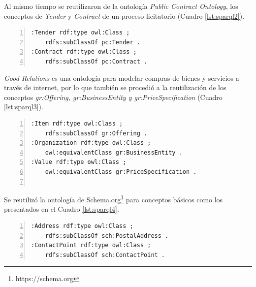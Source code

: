  Al mismo tiempo se reutilizaron de la ontología \textit{Public Contract Ontology}\cite{klimek2012lod2}, los conceptos de \textit{Tender} y \textit{Contract} de un proceso licitatorio (Cuadro \ref{lst:sparql2}).\hfill \break

\noindent\begin{minipage}{\textwidth}
 \begin{lstlisting}[captionpos=b, caption={Conceptos de \textit{Tender} y \textit{Contract}}, label={lst:sparql2},  numbers=left,  numberstyle=\tiny\color{mygray},frame=single]
:Tender rdf:type owl:Class ;
    rdfs:subClassOf pc:Tender .
:Contract rdf:type owl:Class ;
    rdfs:subClassOf pc:Contract .
\end{lstlisting}
\end{minipage}

 \textit{Good Relations}\cite{hepp2008goodrelations} es una ontología para modelar compras de bienes y servicios a través de internet, por lo que también se procedió a la reutilización de los conceptos \textit{gr:Offering, gr:BusinessEntity y gr:PriceSpecification} (Cuadro \ref{lst:sparql3}).\hfill \break

\noindent\begin{minipage}{\textwidth}
 \begin{lstlisting}[captionpos=b, caption={Conceptos de \textit{Organization} y \textit{Price} }, label={lst:sparql3},  numbers=left,  numberstyle=\tiny\color{mygray},frame=single]
:Item rdf:type owl:Class ;
    rdfs:subClassOf gr:Offering .
:Organization rdf:type owl:Class ;
    owl:equivalentClass gr:BusinessEntity .
:Value rdf:type owl:Class ;
    owl:equivalentClass gr:PriceSpecification .


 \end{lstlisting}
\end{minipage}

 Se reutilizó la ontología de Schema.org\footnote{https://schema.org} para conceptos básicos como los presentados en el Cuadro \ref{lst:sparql4}.\hfill \break

\noindent\begin{minipage}{\textwidth}
 \begin{lstlisting}[captionpos=b, caption={Reutilización de Schema.org}, label={lst:sparql4},  numbers=left,  numberstyle=\tiny\color{mygray},frame=single]
:Address rdf:type owl:Class ;
    rdfs:subClassOf sch:PostalAddress .
:ContactPoint rdf:type owl:Class ;
    rdfs:subClassOf sch:ContactPoint .
 \end{lstlisting}
\end{minipage}

